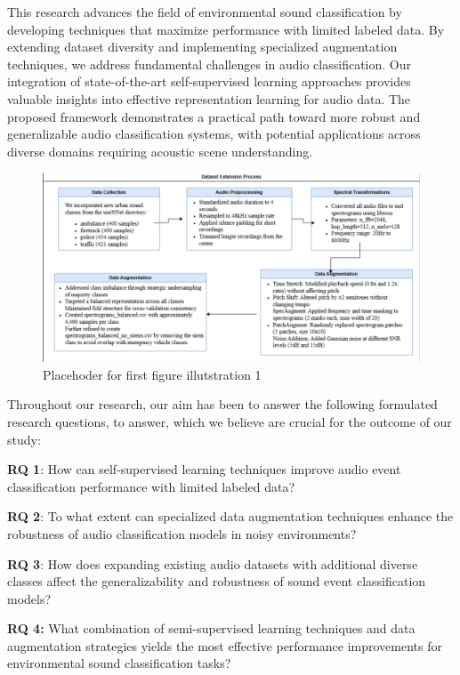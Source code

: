 \documentclass[11pt]{article}
\begin{document}
This research advances the field of environmental sound classification by developing techniques that maximize performance with limited labeled data. By extending dataset diversity and implementing specialized augmentation techniques, we address fundamental challenges in audio classification. Our integration of state-of-the-art self-supervised learning approaches provides valuable insights into effective representation learning for audio data. The proposed framework demonstrates a practical path toward more robust and generalizable audio classification systems, with potential applications across diverse domains requiring acoustic scene understanding.
\begin{figure}
    \centering
    \includegraphics[width=1\linewidth]{latex/assets/dataset_extension_process.PNG}
    \caption{Placehoder for first figure illutstration 1}
    
\end{figure}
Throughout our research, our aim has been to answer the following formulated research questions, to answer, which we believe are crucial for the outcome of our study:

\textbf{RQ 1}: How can self-supervised learning techniques improve audio event classification performance with limited labeled data? 

\textbf{RQ 2}: To what extent can specialized data augmentation techniques enhance the robustness of audio classification models in noisy environments? 

\textbf{RQ 3}: How does expanding existing audio datasets with additional diverse classes affect the generalizability and robustness of sound event classification models?

\textbf{RQ 4: }What combination of semi-supervised learning techniques and data augmentation strategies yields the most effective performance improvements for environmental sound classification tasks?
\end{document}
